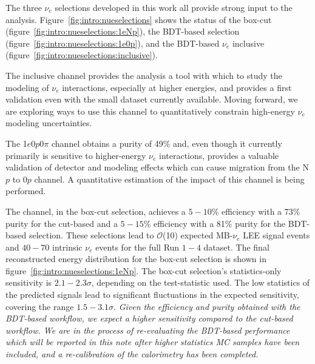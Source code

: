 \par The three $\nu_e$ selections developed in this work all provide strong input to the analysis. Figure~\ref{fig:intro:nueselections} shows the status of the box-cut \npsel (figure~\ref{fig:intro:nueselections:1eNp}), the BDT-based \zpsel selection (figure~\ref{fig:intro:nueselections:1e0p}), and the BDT-based $\nu_e$ inclusive (figure~\ref{fig:intro:nueselections:inclusive}). \par The inclusive channel provides the analysis a tool with which to study the modeling of $\nu_e$ interactions, especially at higher energies, and provides a first validation even with the small dataset currently available. Moving forward, we are exploring ways to use this channel to quantitatively constrain high-energy $\nu_e$ modeling uncertainties.
\par The 1$e$0$p$0$\pi$ channel obtains a purity of 49\% and, even though it currently primarily is sensitive to higher-energy $\nu_e$ interactions, provides a valuable validation of detector and modeling effects which can cause migration from the N$p$ to 0$p$ channel. A quantitative estimation of the impact of this channel is being performed.
\par The \npsel channel, in the box-cut selection, achieves a $5-10$\% efficiency with a 73\%  purity for the cut-based  and a $5-15$\% efficiency with a 81\%  purity for the BDT-based selection. These selections lead to $\mathcal{O}$(10) expected MB-$\nu_e$ LEE signal events and $40-70$ intrinsic $\nu_e$ events for the full Run $1-4$ dataset. The final reconstructed energy distribution for the box-cut selection is shown in figure~\ref{fig:intro:nueselections:1eNp}. The box-cut selection's statistics-only sensitivity is $2.1-2.3\sigma$, depending on the test-statistic used. The low statistics of the predicted signals lead to significant fluctuations in the expected sensitivity, covering the range $1.5-3.1\sigma$. 
 \emph{Given the efficiency and purity obtained with the BDT-based workflow, we expect a higher sensitivity compared to the cut-based workflow.  We are in the process of re-evaluating the BDT-based performance which will be reported in this note after higher statistics MC samples have been included, and a re-calibration of the calorimetry has been completed.} 

